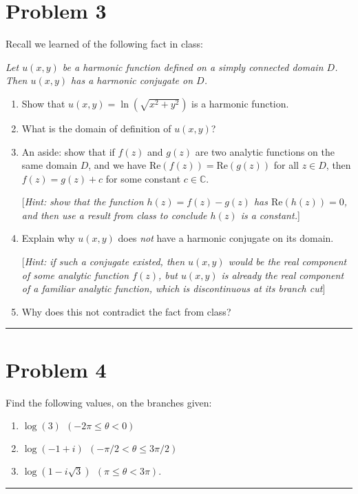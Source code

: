 \documentclass{article}
\begin{document}
\section*{Problem 3}
Recall we learned of the following fact in class:

\begin{center}
	{\em Let $u(x,y)$ be a harmonic function defined on a simply connected domain $D$. \\ Then $u(x,y)$ has a harmonic conjugate on $D$.}
\end{center}

\begin{enumerate}
	\item [(a)] Show that $u(x,y) = \ln(\sqrt{x^2 + y^2})$ is a harmonic function.

	\item [(b)] What is the domain of definition of $u(x,y)$?

	\item [(c)] An aside: show that if $f(z)$ and $g(z)$ are two analytic functions on the same domain $D$, and we have $\text{Re}(f(z)) = \text{Re}(g(z))$ for all $z \in D$, then $f(z) = g(z) + c$ for some constant $c \in \mathbb{C}$.

          [{\em Hint: show that the function $h(z) = f(z) - g(z)$ has $\text{Re}(h(z)) = 0$, and then use a result from class to conclude $h(z)$ is a constant.}]

	\item [(d)] Explain why $u(x,y)$ does {\it not} have a harmonic conjugate on its domain.

          [{\em Hint: if such a conjugate existed, then $u(x,y)$ would be the real component of some analytic function $f(z)$, but $u(x,y)$ is already the real component of a familiar analytic function, which is discontinuous at its branch cut}]

	\item Why does this not contradict the fact from class?
\end{enumerate}

\vspace{.5cm} %

\hrule

\newpage
\section*{Problem 4}
Find the following values, on the branches given:
\begin{enumerate}
	\item [(a)] $ \log(3) \ \ (-2\pi \leq \theta < 0)$ 
	\item [(b)] $ \log(-1 + i) \ \ (-\pi/2 < \theta \leq 3 \pi / 2)$
	\item [(c)] $ \log(1 - i \sqrt 3) \ \ (\pi \leq \theta < 3 \pi)$.
\end{enumerate}
\hrule
\vspace{.5cm} %
\end{document}
